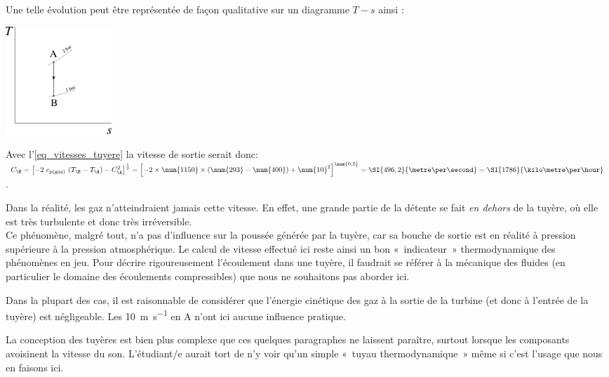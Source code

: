 \begin{anexample}
\begin{answer}
					Une telle évolution peut être représentée de façon qualitative sur un diagramme $T-s$ ainsi :
						\begin{center}\includegraphics[width=4cm]{images/exe_ts_tuyere.png}\end{center}
					Avec l’\cref{eq_vitesses_tuyere} la vitesse de sortie serait donc:\\
					$C_\B = \left[ - 2 \ c_{p \text{(gaz)}} \ (T_\B - T_\A) - C_\A^2 \right]^{\frac{1}{2}}
							= \left[ - 2 \times \num{1150} \times (\num{293} - \num{400}) + \num{10}^2 \right]^{\num{0,5}}
							= \SI{496,2}{\metre\per\second} = \SI{1786}{\kilo\metre\per\hour}$.
								\begin{remark}
									Dans la réalité, les gaz n’atteindraient jamais cette vitesse. En effet, une grande partie de la détente se fait \emph{en dehors} de la tuyère, où elle est très turbulente et donc très irréversible.\\
									Ce phénomène, malgré tout, n’a pas d’influence sur la poussée générée par la tuyère, car sa bouche de sortie est en réalité à pression supérieure à la pression atmosphérique. Le calcul de vitesse effectué ici reste ainsi un bon «~indicateur~» thermodynamique des phénomènes en jeu. Pour décrire rigoureusement l’écoulement dans une tuyère, il faudrait se référer à la mécanique des fluides (en particulier le domaine des écoulements compressibles) que nous ne souhaitons pas aborder ici.
								\end{remark}
								\begin{remark}
									Dans la plupart des cas, il est raisonnable de considérer que l’énergie cinétique des gaz à la sortie de la turbine (et donc à l’entrée de la tuyère) est négligeable. Les \SI{10}{\metre\per\second} en A n’ont ici aucune influence pratique.
								\end{remark}
				\end{answer}
		\end{anexample}

		La conception des tuyères est bien plus complexe que ces quelques paragraphes ne laissent paraître, surtout lorsque les composants avoisinent la vitesse du son. L’étudiant/e aurait tort de n’y voir qu’un simple «~tuyau thermodynamique~» même si c’est l’usage que nous en faisons ici.

